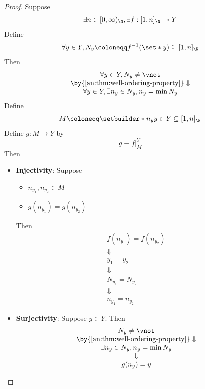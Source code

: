 \begin{proof}
  Suppose
  \[
    \exists n \in [0, \infty)_{\N}, \exists f: [1, n]_{\N} \twoheadrightarrow Y
  \]
  Define
  \[
    \forall y \in Y, N_{y} \coloneqq f^{-1}(\set*{y}) \subseteq [1, n]_{\N}
  \]
  Then
  \[
    \begin{array}{c}
      \forall y \in Y, N_{y} \neq \vnot                    \\
      \by{\Cref{an:thm:well-ordering-property}} \Downarrow \\
      \forall y \in Y, \exists n_{y} \in N_{y}, n_{y} = \min N_{y}
    \end{array}
  \]
  Define
  \[
    M \coloneqq \setbuilder*{n_{y}}{y \in Y} \subseteq [1, n]_{\N}
  \]
  Define $g: M \to Y$ by
  \[
    g \equiv f|_{M}^{Y}
  \]
  Then
  \begin{itemize}
    \item \textbf{Injectivity}: Suppose
          \begin{itemize}
            \item $n_{y_{1}}, n_{y_{2}} \in M$
            \item $g(n_{y_{1}}) = g(n_{y_{2}})$
          \end{itemize}
          Then
          \[
            \begin{array}{c}
              f(n_{y_{1}}) = f(n_{y_{2}}) \\
              \Downarrow                  \\
              y_{1} = y_{2}               \\
              \Downarrow                  \\
              N_{y_{1}} = N_{y_{2}}       \\
              \Downarrow                  \\
              n_{y_{1}} = n_{y_{2}}
            \end{array}
          \]
    \item \textbf{Surjectivity}: Suppose $y \in Y$. Then
          \[
            \begin{array}{c}
              N_{y} \neq \vnot                                     \\
              \by{\Cref{an:thm:well-ordering-property}} \Downarrow \\
              \exists n_{y} \in N_{y}, n_{y} = \min N_{y}          \\
              \Downarrow                                           \\
              g(n_{y}) = y

\end{array}\]
\end{itemize}
\end{proof}
